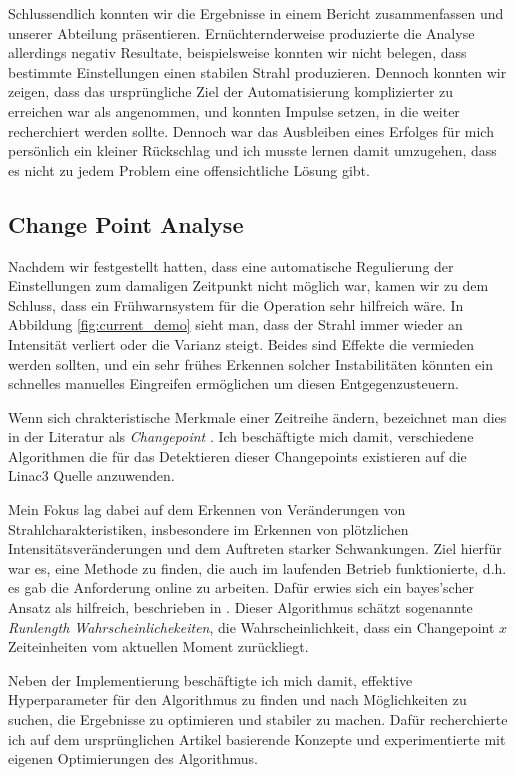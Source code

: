 \documentclass[11pt, a4paper, titlepage, headings=standardclasses]{scrartcl}
\begin{document}
Schlussendlich konnten wir die Ergebnisse in einem Bericht zusammenfassen und unserer Abteilung präsentieren. Ernüchternderweise produzierte die Analyse allerdings negativ Resultate, beispielsweise konnten wir nicht belegen, dass bestimmte Einstellungen einen stabilen Strahl produzieren. Dennoch konnten wir zeigen, dass das ursprüngliche Ziel der Automatisierung komplizierter zu erreichen war als angenommen, und konnten Impulse setzen, in die weiter recherchiert werden sollte. Dennoch war das Ausbleiben eines Erfolges für mich persönlich ein kleiner Rückschlag und ich musste lernen damit umzugehen, dass es nicht zu jedem Problem eine offensichtliche Lösung gibt.

\subsection*{Change Point Analyse}

Nachdem wir festgestellt hatten, dass eine automatische Regulierung der Einstellungen zum damaligen Zeitpunkt nicht möglich war, kamen wir zu dem Schluss, dass ein Frühwarnsystem für die Operation sehr hilfreich wäre. In Abbildung \ref{fig:current_demo} sieht man, dass der Strahl immer wieder an Intensität verliert oder die Varianz steigt. Beides sind Effekte die vermieden werden sollten, und ein sehr frühes Erkennen solcher Instabilitäten könnten ein schnelles manuelles Eingreifen ermöglichen um diesen Entgegenzusteuern.

Wenn sich chrakteristische Merkmale einer Zeitreihe ändern, bezeichnet man dies in der Literatur als \textit{Changepoint} \cite{Aminikhanghahi:surveymethodstime}. Ich beschäftigte mich damit, verschiedene Algorithmen die für das Detektieren dieser Changepoints existieren auf die Linac3 Quelle anzuwenden.

Mein Fokus lag dabei auf dem Erkennen von Veränderungen von Strahlcharakteristiken, insbesondere im Erkennen von plötzlichen Intensitätsveränderungen und dem Auftreten starker Schwankungen. Ziel hierfür war es, eine Methode zu finden, die auch im laufenden Betrieb funktionierte, d.h. es gab die Anforderung online zu arbeiten. Dafür erwies sich ein bayes'scher Ansatz als hilfreich, beschrieben in \cite{Adams:BayesianOnlineChangepoint}. Dieser Algorithmus schätzt sogenannte \textit{Runlength Wahrscheinlichekeiten}, die Wahrscheinlichkeit, dass ein Changepoint $x$ Zeiteinheiten vom aktuellen Moment zurückliegt.

Neben der Implementierung beschäftigte ich mich damit, effektive Hyperparameter für den Algorithmus zu finden und nach Möglichkeiten zu suchen, die Ergebnisse zu optimieren und stabiler zu machen. Dafür recherchierte ich auf dem ursprünglichen Artikel basierende Konzepte und experimentierte mit eigenen Optimierungen des Algorithmus. 
\end{document}
